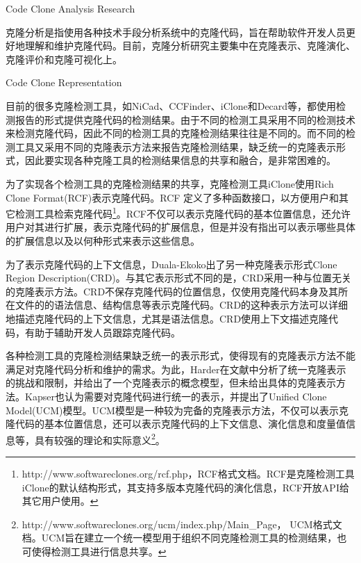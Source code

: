 {Code Clone Analysis Research}

克隆分析是指使用各种技术手段分析系统中的克隆代码，旨在帮助软件开发人员更好地理解和维护克隆代码。目前，克隆分析研究主要集中在克隆表示、克隆演化、克隆评价和克隆可视化上。

{Code Clone Representation}


目前的很多克隆检测工具，如NiCad、CCFinder、iClone和Decard等，都使用检测报告的形式提供克隆代码的检测结果。由于不同的检测工具采用不同的检测技术来检测克隆代码，因此不同的检测工具的克隆检测结果往往是不同的。而不同的检测工具又采用不同的克隆表示方法来报告克隆检测结果，缺乏统一的克隆表示形式，因此要实现各种克隆工具的检测结果信息的共享和融合，是非常困难的。

为了实现各个检测工具的克隆检测结果的共享，克隆检测工具iClone使用Rich Clone Format(RCF)表示克隆代码\cite{harder2011efficiently}。RCF 定义了多种函数接口，以方便用户和其它检测工具检索克隆代码\footnote{http://www.softwareclones.org/rcf.php，RCF格式文档。RCF是克隆检测工具iClone的默认结构形式，其支持多版本克隆代码的演化信息，RCF开放API给其它用户使用。}。RCF不仅可以表示克隆代码的基本位置信息，还允许用户对其进行扩展，表示克隆代码的扩展信息，但是并没有指出可以表示哪些具体的扩展信息以及以何种形式来表示这些信息。%

为了表示克隆代码的上下文信息，Duala-Ekoko出了另一种克隆表示形式Clone Region Description(CRD)\cite{duala2010clone}。与其它表示形式不同的是，CRD采用一种与位置无关的克隆表示方法。CRD不保存克隆代码的位置信息，仅使用克隆代码本身及其所在文件的的语法信息、结构信息等表示克隆代码。CRD的这种表示方法可以详细地描述克隆代码的上下文信息，尤其是语法信息。CRD使用上下文描述克隆代码，有助于辅助开发人员跟踪克隆代码。%

各种检测工具的克隆检测结果缺乏统一的表示形式，使得现有的克隆表示方法不能满足对克隆代码分析和维护的需求。为此，Harder在文献\cite{harder2013limits}中分析了统一克隆表示的挑战和限制，并给出了一个克隆表示的概念模型，但未给出具体的克隆表示方法。Kapser也认为需要对克隆代码进行统一的表示，并提出了Unified Clone Model(UCM)模型\cite{kapser2012common}。UCM模型是一种较为完备的克隆表示方法，不仅可以表示克隆代码的基本位置信息，还可以表示克隆代码的上下文信息、演化信息和度量值信息等，具有较强的理论和实际意义\footnote{http://www.softwareclones.org/ucm/index.php/Main\_Page， UCM格式文档。UCM旨在建立一个统一模型用于组织不同克隆检测工具的检测结果，也可使得检测工具进行信息共享。}。

